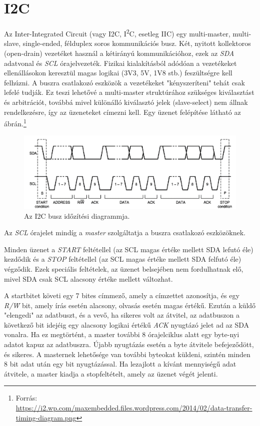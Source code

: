 \section{I2C} {
    Az Inter-Integrated Circuit (vagy I2C, I\textsuperscript{2}C, esetleg IIC) egy multi-master, multi-slave, single-ended, félduplex soros kommunikációs busz.
    Két, nyitott kollektoros (open-drain) vezetéket használ a kétirányú kommunikációhoz, ezek az \emph{SDA} adatvonal és \emph{SCL} órajelvezeték. Fizikai kialakításból adódóan a vezetékeket ellenállásokon keresztül magas logikai (3V3, 5V, 1V8 stb.) feszültségre kell felhúzni. A buszra csatlakozó eszközök a vezetékeket "kényszeríteni" tehát csak lefelé tudják. Ez teszi lehetővé a multi-master struktúrához szükséges kiválasztást és arbitrációt, továbbá mivel különálló kiválasztó jelek (slave-select) nem állnak rendelkezésre, így az üzeneteket címezni kell. Egy üzenet felépítése látható az  ábrán.\footnote{Forrás: \tiny\\\url{https://i2.wp.com/maxembedded.files.wordpress.com/2014/02/data-transfer-timing-diagram.png}}

    \begin{figure}[ht!]
        \includegraphics[width = \textwidth]{figures/i2ctiming}
        \caption{Az I2C busz időzítési diagrammja.}
        \label{fig:I2Cmessage}
    \end{figure}

    Az \emph{SCL} órajelet mindíg a \emph{master} szolgáltatja a buszra csatlakozó eszközöknek.

    Minden üzenet a \emph{START} feltétellel (az SCL magas értéke mellett SDA lefutó éle) kezdődik és a \emph{STOP} feltétellel (az SCL magas értéke mellett SDA felfutó éle) végződik. Ezek speciális feltételek, az üzenet belsejében nem fordulhatnak elő, mivel SDA csak SCL alacsony értéke mellett változhat.

    A startbitet követi egy 7 bites címmező, amely a címzettet azonosítja, és egy \emph{R/\={W}} bit, amely írás esetén alacsony, olvasás esetén magas értékű. Ezután a küldő "elengedi" az adatbuszt, és a vevő, ha sikeres volt az átvitel, az adatbuszon a következő bit idejéig egy alacsony logikai értékű \emph{ACK} nyugtázó jelet ad az SDA vonalra. Ha ez megtörtént, a master további 8 órajelciklus alatt egy byte-nyi adatot kapuz az adatbuszra. Újabb nyugtázás esetén a byte átvitele befejeződött, és sikeres. A masternek lehetősége van további byteokat küldeni, szintén minden 8 bit adat után egy bit nyugtázással. Ha lezajlott a kívánt mennyiségű adat átvitele, a master kiadja a stopfeltételt, amely az üzenet végét jelenti.
}
